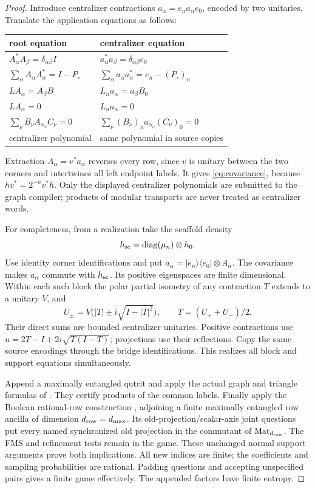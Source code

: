 \begin{proof}
Introduce centralizer contractions $a_\alpha=e_na_\alpha e_0$, encoded by two unitaries. Translate the application equations as follows:
\begin{center}\small
\begin{tabular}{@{}ll@{}}\toprule
root equation&centralizer equation\\\midrule
$A_\alpha^*A_\beta=\delta_{\alpha\beta}I$&$a_\alpha^*a_\beta=\delta_{\alpha\beta}e_0$\\
$\sum_\alpha A_\alpha A_\alpha^*=I-P_\circ$&$\sum_\alpha a_\alpha a_\alpha^*=e_n-(P_\circ)_n$\\
$LA_\alpha=A_\beta B$&$L_na_\alpha=a_\beta B_0$\\
$LA_\alpha=0$&$L_na_\alpha=0$\\
$\sum_\nu B_\nu A_{\alpha_\nu}C_\nu=0$&$\sum_\nu (B_\nu)_na_{\alpha_\nu}(C_\nu)_0=0$\\
centralizer polynomial&same polynomial in source copies\\\bottomrule
\end{tabular}
\end{center}
Extraction $A_\alpha=v^*a_\alpha$ reverses every row, since $v$ is unitary between the two corners and intertwines all left endpoint labels. It gives \eqref{eq:covariance}, because $hv^*=2^{-n}v^*h$. Only the displayed centralizer polynomials are submitted to the graph compiler; products of modular transports are never treated as centralizer words.

For completeness, from a realization take the scaffold density
\begin{equation}\label{eq:scaffolddensity}
 h_{\rm sc}=\operatorname{diag}(\mu_n)\otimes h_0.
\end{equation}
Use identity corner identifications and put $a_\alpha=|e_n\rangle\langle e_0|\otimes A_\alpha$. The covariance makes $a_\alpha$ commute with $h_{\rm sc}$. Its positive eigenspaces are finite dimensional. Within each such block the polar partial isometry of any contraction $T$ extends to a unitary $V$, and
\[
 U_\pm=V\bigl(|T|\pm i\sqrt{I-|T|^2}\bigr),\qquad T=(U_++U_-)/2.
\]
Their direct sums are bounded centralizer unitaries. Positive contractions use $u=2T-I+2i\sqrt{T(I-T)}$; projections use their reflections. Copy the same source encodings through the bridge identifications. This realizes all block and support equations simultaneously.

Append a maximally entangled qutrit and apply the actual graph and triangle formulas of \cite[Section~4.2]{Sigma2}. They certify products of the common labels. Finally apply the Boolean rational-row construction \cite[Lemma~4.3]{Sigma2}, adjoining a finite maximally entangled row ancilla of dimension $d_{\mathrm{row}}=d_{\max}$. Its old-projection/scalar-axis joint questions put every named synchronized old projection in the commutant of $\mathrm{Mat}_{d_{\mathrm{row}}}$. The FMS and refinement tests remain in the game. These unchanged normal support arguments prove both implications. All new indices are finite; the coefficients and sampling probabilities are rational. Padding questions and accepting unspecified pairs gives a finite game effectively. The appended factors have finite entropy.
\end{proof}


